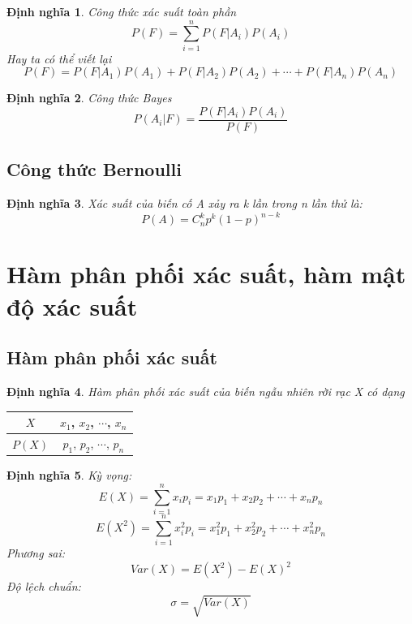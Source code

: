 \documentclass[12pt]{article}
\newtheorem{thm}{Định nghĩa}
\begin{document}
\begin{thm}
Công thức xác suất toàn phần
\begin{equation}
P(F) = \sum_{i=1}^n P(F|A_i)P(A_i)
\end{equation}
Hay ta có thể viết lại
\begin{equation}
P(F) = P(F|A_1)P(A_1) + P(F|A_2)P(A_2) + \cdots + P(F|A_n)P(A_n)
\end{equation}
\end{thm}

\begin{thm}
Công thức Bayes
\begin{equation}
P(A_i|F) = \frac{P(F|A_i)P(A_i)}{P(F)}
\end{equation}
\end{thm}

\subsection{Công thức Bernoulli}

\begin{thm}
Xác suất của biến cố A xảy ra k lần trong n lần thử là:
\begin{equation}
P(A) = C_n^k p^k (1-p)^{n-k}
\end{equation}
\end{thm}

\section{Hàm phân phối xác suất, hàm mật độ xác suất}
\subsection{Hàm phân phối xác suất}
\begin{thm}
Hàm phân phối xác suất của biến ngẫu nhiên rời rạc X có dạng
\end{thm}
\begin{tabular}{|c|c|}
    \hline
    $X$ & $x_1$, $x_2$, $\cdots$, $x_n$ \\
    \hline
    $P(X)$ & $p_1$, $p_2$, $\cdots$, $p_n$ \\
    \hline
  \end{tabular}
\begin{thm}
    Kỳ vọng:
    \begin{equation}
    E(X) = \sum_{i=1}^n x_ip_i = x_1p_1 + x_2p_2 + \cdots + x_np_n
    \end{equation}
    \begin{equation}
    E(X^2) = \sum_{i=1}^n x_i^2p_i = x_1^2p_1 + x_2^2p_2 + \cdots + x_n^2p_n
    \end{equation}
    Phương sai:
    \begin{equation}
    Var(X) = E(X^2) - E(X)^2
    \end{equation}
    Độ lệch chuẩn:
    \begin{equation}
    \sigma = \sqrt{Var(X)}
    \end{equation}
\end{thm}
\end{document}
